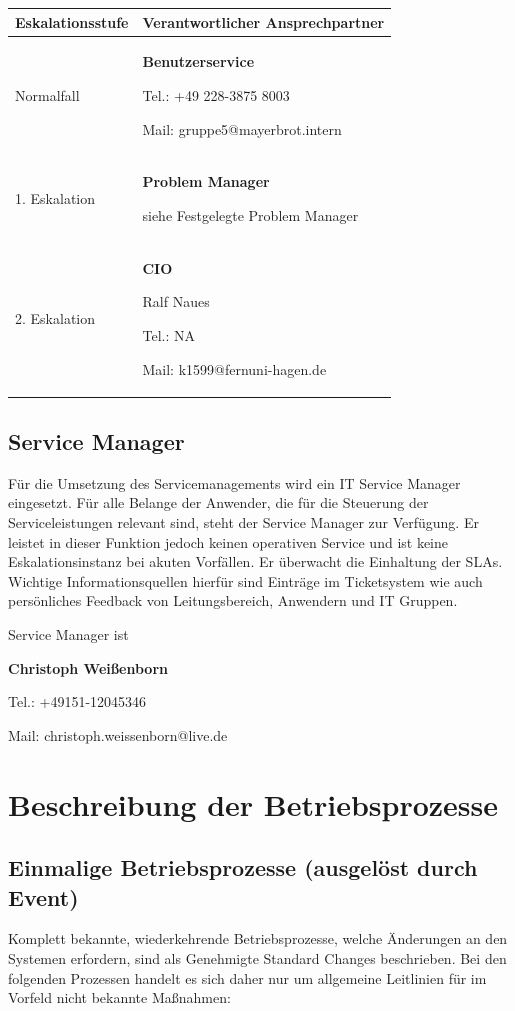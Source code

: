 \documentclass[]{article}
\begin{document}
\begin{longtable}{lp{6cm}}
\toprule
Eskalationsstufe & Verantwortlicher Ansprechpartner\tabularnewline
\midrule
\endhead
Normalfall & \textbf{Benutzerservice}

Tel.: +49 228-3875 8003

Mail: gruppe5@mayerbrot.intern\tabularnewline
1. Eskalation & \textbf{Problem Manager}

siehe Festgelegte Problem Manager\tabularnewline
2. Eskalation & \textbf{CIO}

Ralf Naues

Tel.: NA

Mail: k1599@fernuni-hagen.de\tabularnewline
\bottomrule
\end{longtable}

\subsection{Service Manager}\label{service-manager}

Für die Umsetzung des Servicemanagements wird ein IT Service Manager
eingesetzt. Für alle Belange der Anwender, die für die Steuerung der
Serviceleistungen relevant sind, steht der Service Manager zur
Verfügung. Er leistet in dieser Funktion jedoch keinen operativen
Service und ist keine Eskalationsinstanz bei akuten Vorfällen. Er
überwacht die Einhaltung der SLAs. Wichtige Informationsquellen hierfür
sind Einträge im Ticketsystem wie auch persönliches Feedback von
Leitungsbereich, Anwendern und IT Gruppen.

Service Manager ist

\textbf{Christoph Weißenborn}

Tel.: +49151-12045346

Mail: christoph.weissenborn@live.de

\section{Beschreibung der
Betriebsprozesse}\label{beschreibung-der-betriebsprozesse}

\subsection{Einmalige Betriebsprozesse (ausgelöst durch
Event)}\label{einmalige-betriebsprozesse-ausgeluxf6st-durch-event}

Komplett bekannte, wiederkehrende Betriebsprozesse, welche Änderungen an
den Systemen erfordern, sind als Genehmigte Standard Changes
beschrieben. Bei den folgenden Prozessen handelt es sich daher nur um
allgemeine Leitlinien für im Vorfeld nicht bekannte Maßnahmen:
\end{document}
